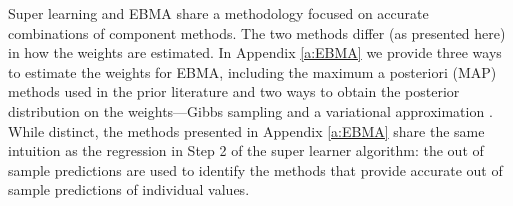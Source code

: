 \documentclass[12pt,letterpaper]{article}
\numberwithin{equation}{section}
\numberwithin{equation}{section}
\begin{document}
Super learning and EBMA share a methodology focused on accurate combinations of component methods.  The two methods differ (as presented here) in how the weights are estimated.  In Appendix \ref{a:EBMA} we provide three ways to estimate the weights for EBMA, including the maximum a posteriori (MAP) methods used in the prior literature \citep{Raftery05, MonHolWar12} and two ways to obtain the posterior distribution on the weights---Gibbs sampling and a variational approximation \citep{Jordan99}.  While distinct, the methods presented in Appendix \ref{a:EBMA} share the same intuition as the regression in Step 2 of the super learner algorithm: the out of sample predictions are used to identify the methods that provide accurate out of sample predictions of individual values.    

\end{document}
